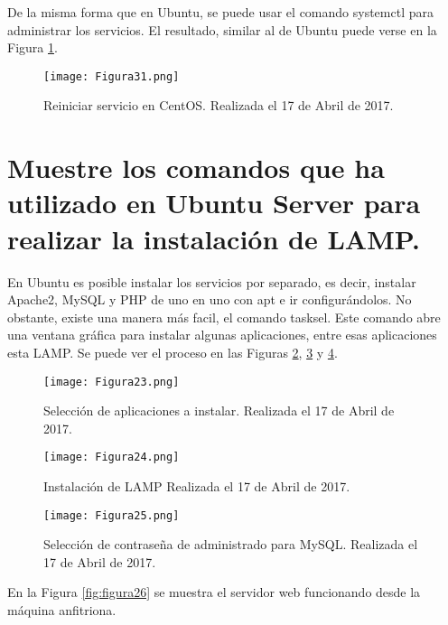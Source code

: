 De la misma forma que en Ubuntu, se puede usar el comando systemctl\cite{centosservice} para administrar los servicios. El resultado, similar al de Ubuntu puede verse en la Figura \ref{fig:figura31}.

\begin{figure}[H] 
\centering
\texttt{[image: Figura31.png]}  
\caption{Reiniciar servicio en CentOS. Realizada el 17 de Abril de 2017.} \label{fig:figura31}
\end{figure}








\section{Muestre los comandos que ha utilizado en Ubuntu Server para realizar la instalación de LAMP.}

En Ubuntu es posible instalar los servicios por separado, es decir, instalar Apache2, MySQL y PHP de uno en uno con apt e ir configurándolos. No obstante, existe
una manera más facil, el comando tasksel\cite{tasksel}. Este comando abre una ventana gráfica para instalar algunas aplicaciones, entre esas aplicaciones esta LAMP.
Se puede ver el proceso en las Figuras \ref{fig:figura23}, \ref{fig:figura24} y \ref{fig:figura25}.

\begin{figure}[H] 
\centering
\texttt{[image: Figura23.png]}  
\caption{Selección de aplicaciones a instalar. Realizada el 17 de Abril de 2017.} \label{fig:figura23}
\end{figure}
\begin{figure}[H] 
\centering
\texttt{[image: Figura24.png]}  
\caption{Instalación de LAMP Realizada el 17 de Abril de 2017.} \label{fig:figura24}
\end{figure}
\begin{figure}[H] 
\centering
\texttt{[image: Figura25.png]}  
\caption{Selección de contraseña de administrado para MySQL. Realizada el 17 de Abril de 2017.} \label{fig:figura25}
\end{figure}

En la Figura \ref{fig:figura26} se muestra el servidor web funcionando desde la máquina anfitriona.

